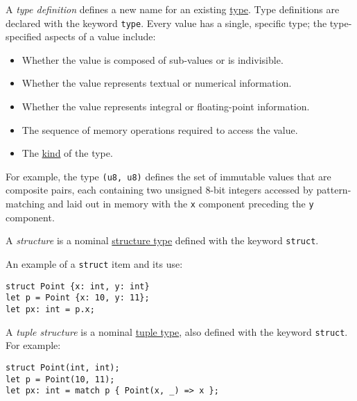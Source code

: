 \documentclass[]{article}
\begin{document}

A \emph{type definition} defines a new name for an existing
\hyperref[types]{type}. Type definitions are declared with the keyword
\texttt{type}. Every value has a single, specific type; the
type-specified aspects of a value include:

\begin{itemize}
\itemsep1pt\parskip0pt
\item
  Whether the value is composed of sub-values or is indivisible.
\item
  Whether the value represents textual or numerical information.
\item
  Whether the value represents integral or floating-point information.
\item
  The sequence of memory operations required to access the value.
\item
  The \hyperref[type-kinds]{kind} of the type.
\end{itemize}

For example, the type \texttt{(u8, u8)} defines the set of immutable
values that are composite pairs, each containing two unsigned 8-bit
integers accessed by pattern-matching and laid out in memory with the
\texttt{x} component preceding the \texttt{y} component.


A \emph{structure} is a nominal \hyperref[structure-types]{structure
type} defined with the keyword \texttt{struct}.

An example of a \texttt{struct} item and its use:

\begin{verbatim}
struct Point {x: int, y: int}
let p = Point {x: 10, y: 11};
let px: int = p.x;
\end{verbatim}

A \emph{tuple structure} is a nominal \hyperref[tuple-types]{tuple
type}, also defined with the keyword \texttt{struct}. For example:

\begin{verbatim}
struct Point(int, int);
let p = Point(10, 11);
let px: int = match p { Point(x, _) => x };
\end{verbatim}
\end{document}
